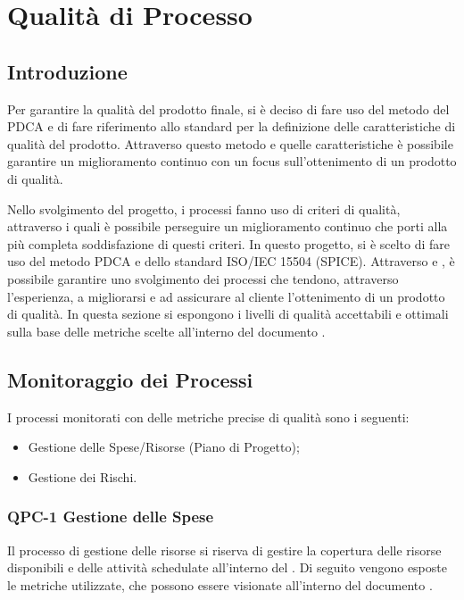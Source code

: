 \section{Qualità di Processo}

\subsection{Introduzione}

Per garantire la qualità del prodotto finale, si è deciso di fare uso del metodo del PDCA  e di fare riferimento allo standard  per la definizione delle caratteristiche di qualità del prodotto.
Attraverso questo metodo e quelle caratteristiche è possibile garantire un miglioramento continuo con un focus sull'ottenimento di un prodotto di qualità.

Nello svolgimento del progetto, i processi fanno uso di criteri di qualità, attraverso i quali è possibile perseguire un miglioramento continuo che porti alla più completa soddisfazione di questi criteri. In questo progetto, si è scelto di fare uso del metodo PDCA e dello standard ISO/IEC 15504 (SPICE). Attraverso  e , è possibile garantire uno svolgimento dei processi che tendono, attraverso l'esperienza, a migliorarsi e ad assicurare al cliente l'ottenimento di un prodotto di qualità.
In questa sezione si espongono i livelli di qualità accettabili e ottimali sulla base delle metriche scelte all'interno del documento .

\subsection{Monitoraggio dei Processi}

I processi monitorati con delle metriche precise di qualità sono i seguenti:

\begin{itemize}
	\item Gestione delle Spese/Risorse (Piano di Progetto);
	\item Gestione dei Rischi.
\end{itemize}

	\subsubsection{QPC-1 Gestione delle Spese}

		Il processo di gestione delle risorse si riserva di gestire la copertura delle risorse disponibili e delle attività schedulate all'interno del . 
		Di seguito vengono esposte le metriche utilizzate, che possono essere visionate all'interno del documento .

